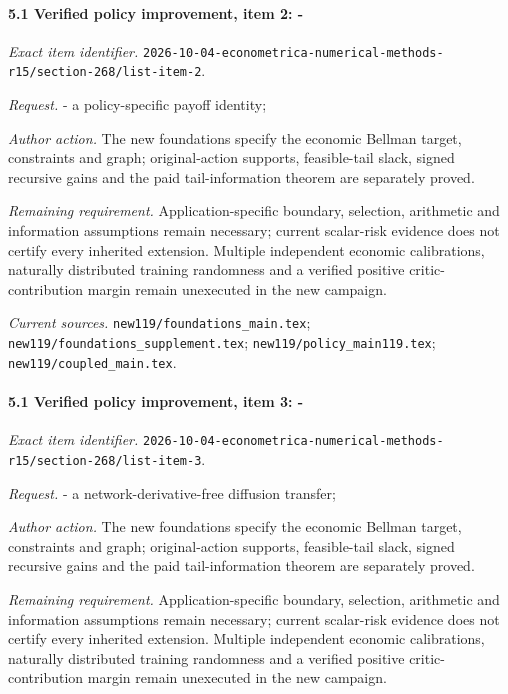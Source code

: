 \paragraph{5.1 Verified policy improvement, item 2: -}

\emph{Exact item identifier.} \nolinkurl{2026-10-04-econometrica-numerical-methods-r15/section-268/list-item-2}.

\par\emph{Request.} - a policy-specific payoff identity;

\par\emph{Author action.} The new foundations specify the economic Bellman target, constraints and graph; original-action supports, feasible-tail slack, signed recursive gains and the paid tail-information theorem are separately proved.

\par\emph{Remaining requirement.} Application-specific boundary, selection, arithmetic and information assumptions remain necessary; current scalar-risk evidence does not certify every inherited extension. Multiple independent economic calibrations, naturally distributed training randomness and a verified positive critic-contribution margin remain unexecuted in the new campaign.

\par\emph{Current sources.} \nolinkurl{new119/foundations_main.tex}; \nolinkurl{new119/foundations_supplement.tex}; \nolinkurl{new119/policy_main119.tex}; \nolinkurl{new119/coupled_main.tex}.

\paragraph{5.1 Verified policy improvement, item 3: -}

\emph{Exact item identifier.} \nolinkurl{2026-10-04-econometrica-numerical-methods-r15/section-268/list-item-3}.

\par\emph{Request.} - a network-derivative-free diffusion transfer;

\par\emph{Author action.} The new foundations specify the economic Bellman target, constraints and graph; original-action supports, feasible-tail slack, signed recursive gains and the paid tail-information theorem are separately proved.

\par\emph{Remaining requirement.} Application-specific boundary, selection, arithmetic and information assumptions remain necessary; current scalar-risk evidence does not certify every inherited extension. Multiple independent economic calibrations, naturally distributed training randomness and a verified positive critic-contribution margin remain unexecuted in the new campaign.

